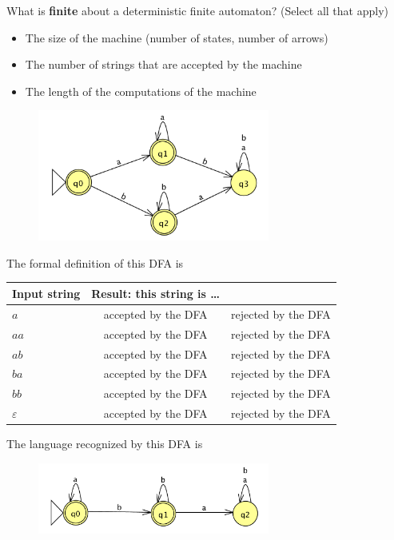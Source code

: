     
    What is {\bf finite} about a deterministic finite automaton? (Select all that apply)
    \begin{itemize}
    \item The size of the machine (number of states, number of arrows)
    \item The number of strings that are accepted by the machine
    \item The length of the computations of the machine
    \end{itemize}
    
    
    
    
    \begin{figure}[h]
       \centering
       \includegraphics[width=3in]{../../resources/machines/Lect2DFA1.png} 
    \end{figure}
    
    The formal definition of this DFA is
    
    \vspace{100pt}
    
    
    \begin{center}
    \begin{tabular}{lcc}
    {\bf Input string} & {\bf Result}: this string is \ldots    & \\
    \hline
    $a$ & accepted by the DFA & rejected by the DFA \\
    $aa$ & accepted by the DFA & rejected by the DFA \\
    $ab$ & accepted by the DFA & rejected by the DFA \\
    $ba$ & accepted by the DFA & rejected by the DFA \\
    $bb$ & accepted by the DFA & rejected by the DFA \\
    $\varepsilon$ & accepted by the DFA & rejected by the DFA \\
    \end{tabular}
    \end{center}
    
    The language recognized by this DFA is
    
    
    \begin{figure}[h]
       \centering
       \includegraphics[width=3in]{../../resources/machines/Lect2DFA2.png} 
    \end{figure}
    

